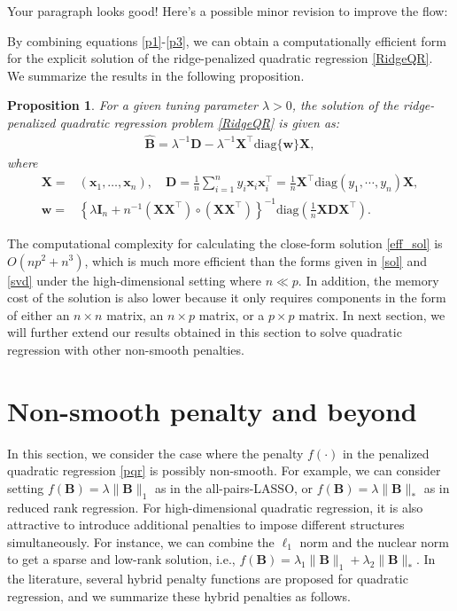 \documentclass[preprint,authoryear,11pt]{elsarticle}
\def\diag{\mbox{diag}}
\newcommand{\bI}{\mathbf I}
\newcommand{\B}{\mathbf B}
\newcommand{\X}{\mathbf X}
\newcommand{\w}{\mathbf w}
\newcommand{\x}{\mathbf x}
\newcommand{\aD}{\mathbf D}
\newcommand{\trans}{^\top}
\newtheorem{prop}{Proposition}[section]
\begin{document}
Your paragraph looks good! Here's a possible minor revision to improve the flow:

By combining equations \eqref{p1}-\eqref{p3}, we can obtain a computationally efficient form for the explicit solution of the ridge-penalized quadratic regression \eqref{RidgeQR}. We summarize the results in the following proposition.
\begin{prop} \label{prop1}
For a given tuning parameter $\lambda>0$, the solution of the ridge-penalized quadratic regression problem \eqref{RidgeQR} is given as:
	\begin{align}\label{eff_sol}
		\widehat{\B}=\lambda^{-1} \aD-\lambda^{-1} \X \trans \diag\{\w\} \X,
	\end{align}
	where 
	\begin{align*}
		\X=&(\x_1,\ldots,\x_n),\quad \aD=\frac{1}{n} \sum_{i=1}^n y_i \x_i \x_i \trans =\frac{1}{n}\X \trans \diag(y_1,\cdots,y_n) \X,\\
			\w=&\left\{ \lambda \bI_n+n^{-1}  (\X \X \trans )\circ (\X  \X \trans ) \right\}^{-1} \diag\left(\frac{1}{n}  \X \aD \X \trans\right).
	\end{align*}
\end{prop}
The computational complexity for calculating the close-form solution \eqref{eff_sol} is $O(np^2+n^3)$, which is  much more efficient than the forms given in \eqref{sol} and \eqref{svd} under the high-dimensional setting where $n\ll p$.  In addition, the memory cost of the solution is also lower because it only requires components in the form of either an $n \times n$ matrix, an $n \times p$ matrix, or a $p \times p$ matrix. In next section, we will further extend our results obtained in this section to solve quadratic regression with other non-smooth penalties.  
 
 

\section{Non-smooth penalty and beyond}

 

In this section, we consider the case where the penalty $f(\cdot)$ in the penalized quadratic regression \eqref{pqr} is possibly non-smooth. For example, we can consider setting $f(\B)=\lambda \|\B\|_1$ as in the all-pairs-LASSO, or $f(\B)=\lambda \|\B\|_*$ as in reduced rank regression. For high-dimensional quadratic regression, it is also attractive to introduce additional penalties to impose different structures simultaneously. For instance, we can combine the $\ell_1$ norm and the nuclear norm to get a sparse and low-rank solution, i.e., $f(\B)=\lambda_1 \|\B\|_1+\lambda_2 \|\B\|_*$. In the literature, several hybrid penalty functions are proposed for quadratic regression, and we summarize these hybrid penalties as follows.
\end{document}
